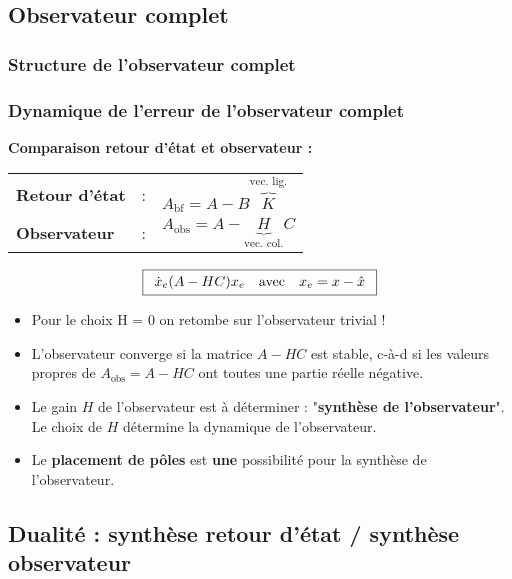 \documentclass[document.tex]{subfiles}
\begin{document}
\subsection{Observateur complet}
\subsubsection{Structure de l'observateur complet}


\subsubsection{Dynamique de l'erreur de l'observateur complet}


\textbf{Comparaison retour d'état et observateur :}


\begin{center}
\begin{tabular}{|| l c l ||}
\hline \hline
\textbf{Retour d'état}	& : 	& $A_{\text{bf}}=A-B\overbrace{\boxed{K}}^{\text{vec. lig.}}$ \\[6pt]
\textbf{Observateur}		& :	& $A_{\text{obs}}=A-\underbrace{\boxed{H}}_{\text{vec. col.}}C$ \\[18pt] \hline \hline
\end{tabular}
\end{center}


$$\boxed{
\begin{array}{c c c}
\dot{x}_e(A-HC)x_e & \text{avec} & x_e = x - \hat{x}
\end{array}
}$$

\begin{itemize}
\item Pour le choix H = 0 on retombe sur l'observateur trivial !
\item L'observateur converge si la matrice \underline{$A-HC$} est stable, c-à-d si les valeurs propres de \underline{$A_{\text{obs}} = A − HC$} ont toutes une partie réelle négative.
\item Le gain \underline{$H$} de l'observateur est à déterminer : "\textbf{synthèse de l'observateur}". Le choix de \underline{$H$} détermine la dynamique de l'observateur.
\item Le \textbf{placement de pôles} est \textbf{une} possibilité pour la synthèse de l'observateur.
\end{itemize}

\subsection{Dualité : synthèse retour d'état / synthèse observateur}
\end{document}

